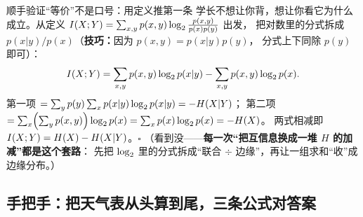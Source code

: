 \begin{calc}{顺手验证“等价”不是口号：用定义推第一条}
学长不想让你背，想让你看它为什么成立。从定义
$I\!\left(X;Y\right)=\sum_{x,y}p(x,y)\log_{2}\frac{p(x,y)}{p(x)p(y)}$ 出发，
把对数里的分式拆成 $p(x|y)/p(x)$（\textbf{技巧：}因为 $p(x,y)=p(x|y)p(y)$，
分式上下同除 $p(y)$ 即可）：
\[
I\!\left(X;Y\right)=\sum_{x,y}p(x,y)\log_{2} p(x|y)-\sum_{x,y}p(x,y)\log_{2} p(x).
\]
第一项 $=\sum_{y}p(y)\sum_{x}p(x|y)\log_{2} p(x|y)=-H\!\left(X|Y\right)$；
第二项 $=\sum_{x}\Bigl(\sum_y p(x,y)\Bigr)\log_{2} p(x)=\sum_x p(x)\log_{2} p(x)=-H\!\left(X\right)$。
两式相减即 $I\!\left(X;Y\right)=H\!\left(X\right)-H\!\left(X|Y\right)$。$\square$
（看到没——\textbf{每一次“把互信息换成一堆 $H$ 的加减”都是这个套路}：
先把 $\log_{2}$ 里的分式拆成“联合 $\div$ 边缘”，再让一组求和“收”成边缘分布。）
\end{calc}

\subsection{手把手：把天气表从头算到尾，三条公式对答案}

